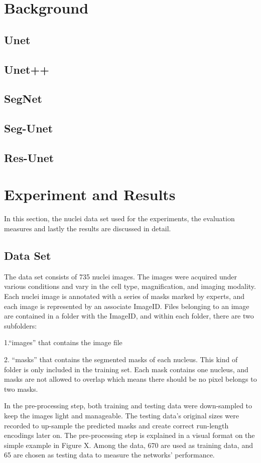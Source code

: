 \documentclass{article}
\begin{document}
\section{Background}

\subsection{Unet}
\subsection{Unet++}
\subsection{SegNet}
\subsection{Seg-Unet}
\subsection{Res-Unet}

\section{Experiment and Results}
In this section, the nuclei data set used for the experiments, the evaluation measures and lastly the results are discussed in detail.
\subsection{Data Set}
The data set consists of 735 nuclei images.
The images were acquired under various conditions and vary in the cell type, magnification, and imaging modality.
Each nuclei image is annotated with a series of masks marked by experts, and each image is represented by an associate ImageID.
Files belonging to an image are contained in a folder with the ImageID, and within each folder, there are two subfolders:

1.“images” that contains the image file

2. “masks” that contains the segmented masks of each nucleus.
This kind of folder is only included in the training set.
Each mask contains one nucleus, and masks are not allowed to overlap which means there should be no pixel belongs to two masks.

In the pre-processing step, both training and testing data were down-sampled to keep the images light and manageable.
The testing data's original sizes were recorded to up-sample the predicted masks and create correct run-length encodings later on.
The pre-processing step is explained in a visual format on the simple example in Figure X. Among the data, 670 are used as training data, and 65 are chosen as testing data to measure the networks' performance.
\end{document}
